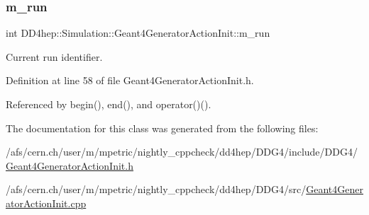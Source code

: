 \subsubsection{\texorpdfstring{m\+\_\+run}{m\_run}}
{\footnotesize\ttfamily int D\+D4hep\+::\+Simulation\+::\+Geant4\+Generator\+Action\+Init\+::m\+\_\+run\hspace{0.3cm}{\ttfamily [protected]}}



Current run identifier. 



Definition at line 58 of file Geant4\+Generator\+Action\+Init.\+h.



Referenced by begin(), end(), and operator()().



The documentation for this class was generated from the following files\+:\begin{DoxyCompactItemize}
\item 
/afs/cern.\+ch/user/m/mpetric/nightly\+\_\+cppcheck/dd4hep/\+D\+D\+G4/include/\+D\+D\+G4/\hyperlink{_geant4_generator_action_init_8h}{Geant4\+Generator\+Action\+Init.\+h}\item 
/afs/cern.\+ch/user/m/mpetric/nightly\+\_\+cppcheck/dd4hep/\+D\+D\+G4/src/\hyperlink{_geant4_generator_action_init_8cpp}{Geant4\+Generator\+Action\+Init.\+cpp}\end{DoxyCompactItemize}

